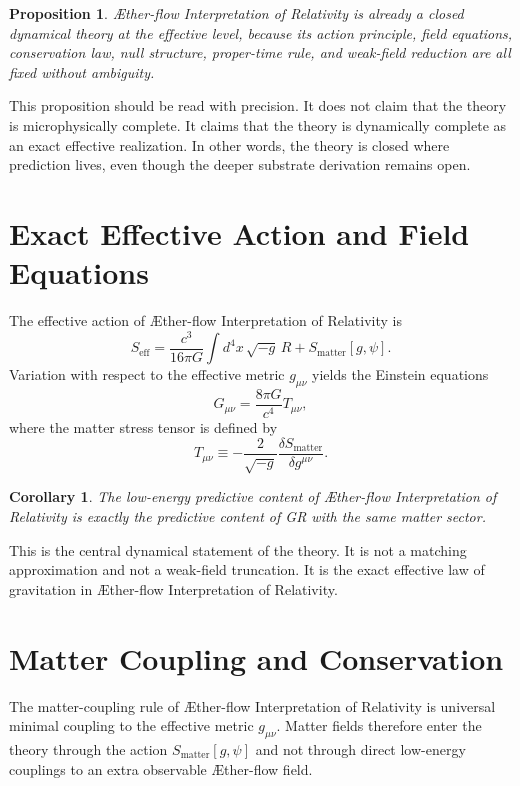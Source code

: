 \documentclass[11pt]{article}
\newcommand{\Aflow}{\AE{}ther-flow}
\newcommand{\TheoryName}{\Aflow{} Interpretation of Relativity}
\newtheorem{proposition}{Proposition}
\newtheorem{corollary}{Corollary}
\begin{document}
\begin{proposition}
\TheoryName{} is already a closed dynamical theory at the effective level, because its action principle, field equations, conservation law, null structure, proper-time rule, and weak-field reduction are all fixed without ambiguity.
\end{proposition}

This proposition should be read with precision. It does not claim that the theory is microphysically complete. It claims that the theory is dynamically complete as an exact effective realization. In other words, the theory is closed where prediction lives, even though the deeper substrate derivation remains open.

\section{Exact Effective Action and Field Equations}

The effective action of \TheoryName{} is
\begin{equation}
S_{\mathrm{eff}}
=
\frac{c^3}{16\pi G}\int d^4x\,\sqrt{-g}\,R
+
S_{\mathrm{matter}}[g,\psi].
\label{eq:SA}
\end{equation}
Variation with respect to the effective metric \(g_{\mu\nu}\) yields the Einstein equations
\begin{equation}
G_{\mu\nu}=\frac{8\pi G}{c^4}T_{\mu\nu},
\label{eq:einstein}
\end{equation}
where the matter stress tensor is defined by
\begin{equation}
T_{\mu\nu}
\equiv
-\frac{2}{\sqrt{-g}}
\frac{\delta S_{\mathrm{matter}}}{\delta g^{\mu\nu}}.
\label{eq:stress}
\end{equation}

\begin{corollary}
The low-energy predictive content of \TheoryName{} is exactly the predictive content of GR with the same matter sector.
\end{corollary}

This is the central dynamical statement of the theory. It is not a matching approximation and not a weak-field truncation. It is the exact effective law of gravitation in \TheoryName{}.

\section{Matter Coupling and Conservation}

The matter-coupling rule of \TheoryName{} is universal minimal coupling to the effective metric \(g_{\mu\nu}\). Matter fields therefore enter the theory through the action \(S_{\mathrm{matter}}[g,\psi]\) and not through direct low-energy couplings to an extra observable \Aflow{} field.
\end{document}
